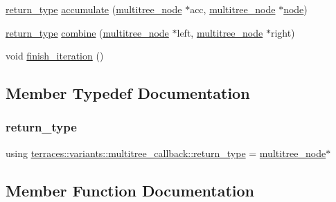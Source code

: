 \begin{DoxyCompactItemize}
\item 
\hyperlink{classterraces_1_1variants_1_1multitree__callback_a31341dbe798daa06859cd3e0ab354bf1}{return\+\_\+type} \hyperlink{classterraces_1_1variants_1_1multitree__callback_ad4358ee590df9e132e16bd4ef98b9509}{accumulate} (\hyperlink{structterraces_1_1multitree__node}{multitree\+\_\+node} $\ast$acc, \hyperlink{structterraces_1_1multitree__node}{multitree\+\_\+node} $\ast$\hyperlink{structterraces_1_1node}{node})
\item 
\hyperlink{classterraces_1_1variants_1_1multitree__callback_a31341dbe798daa06859cd3e0ab354bf1}{return\+\_\+type} \hyperlink{classterraces_1_1variants_1_1multitree__callback_a9b54c60bdca2c762bc8b358b9173eb69}{combine} (\hyperlink{structterraces_1_1multitree__node}{multitree\+\_\+node} $\ast$left, \hyperlink{structterraces_1_1multitree__node}{multitree\+\_\+node} $\ast$right)
\item 
void \hyperlink{classterraces_1_1variants_1_1multitree__callback_ab9765a7cf217bcffe4c81648e829ef92}{finish\+\_\+iteration} ()
\end{DoxyCompactItemize}


\subsection{Member Typedef Documentation}
\mbox{\label{classterraces_1_1variants_1_1multitree__callback_a31341dbe798daa06859cd3e0ab354bf1}} 
\subsubsection{\texorpdfstring{return\+\_\+type}{return\_type}}
{\footnotesize\ttfamily using \hyperlink{classterraces_1_1variants_1_1multitree__callback_a31341dbe798daa06859cd3e0ab354bf1}{terraces\+::variants\+::multitree\+\_\+callback\+::return\+\_\+type} =  \hyperlink{structterraces_1_1multitree__node}{multitree\+\_\+node}$\ast$}



\subsection{Member Function Documentation}
\mbox{\label{classterraces_1_1variants_1_1multitree__callback_ad4358ee590df9e132e16bd4ef98b9509}} 
